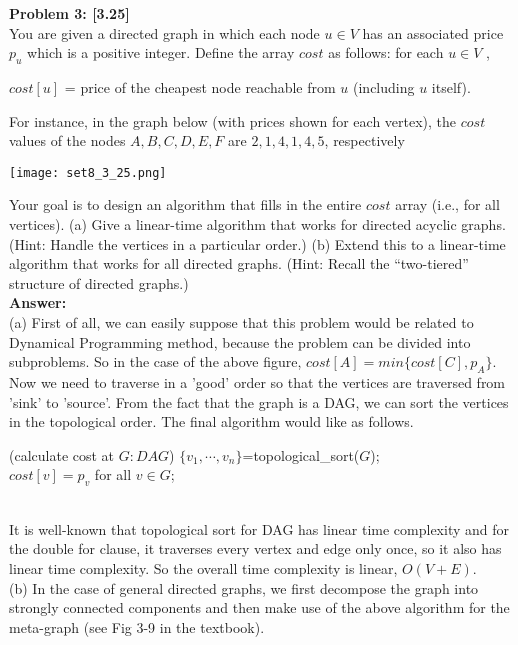 \documentclass{article}
\begin{document}
\pagebreak
{\bf Problem 3: [3.25]}\\
You are given a directed graph in which each node $u\in V$ has an associated price $p_u$ which is a positive integer. Define the array $cost$ as follows: for each $u\in V$ ,
\begin{center}
$cost[u]$ = price of the cheapest node reachable from $u$ (including $u$ itself).
\end{center}
For instance, in the graph below (with prices shown for each vertex), the $cost$ values of the nodes $A, B, C, D, E, F$ are $2, 1, 4, 1, 4, 5$, respectively
\begin{center}
	\centering
	\texttt{[image: set8\_3\_25.png]}
\end{center}
Your goal is to design an algorithm that fills in the entire $cost$ array (i.e., for all vertices).
(a) Give a linear-time algorithm that works for directed acyclic graphs. (Hint: Handle the
vertices in a particular order.)
(b) Extend this to a linear-time algorithm that works for all directed graphs. (Hint: Recall the “two-tiered” structure of directed graphs.)\\
{\bf Answer:}\\
(a) First of all, we can easily suppose that this problem would be related to Dynamical Programming method, because the problem can be divided into subproblems. So in the case of the above figure, $cost[A]=min\{cost[C], p_A\}$. Now we need to traverse in a 'good' order so that the vertices are traversed from 'sink' to 'source'. From the fact that the graph is a DAG, we can sort the vertices in the topological order. The final algorithm would like as follows.
\begin{algorithm}
	\Begin(calculate cost at $G: DAG$){
		$\{v_1,\cdots,v_n\}$=topological\_sort($G$);\\
		$cost[v]=p_v$ for all $v\in G$;\\
	}
\end{algorithm}\\
It is well-known that topological sort for DAG has linear time complexity and for the double for clause, it traverses every vertex and edge only once, so it also has linear time complexity. So the overall time complexity is linear, $O(V+E)$.\\
(b) In the case of general directed graphs, we first decompose the graph into strongly connected components and then make use of the above algorithm for the meta-graph (see Fig 3-9 in the textbook).\\
\end{document}
